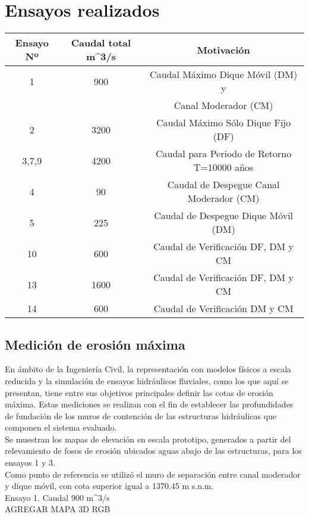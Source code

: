 \section{Ensayos realizados}

\begin{tabular}{|c|c|c|}
\hline
Ensayo Nº & Caudal total m^{3}/s & Motivación \\
\hline
1 & 900 & Caudal Máximo Dique Móvil (DM) y \\
  &     & Canal Moderador (CM) \\
\hline
2 & 3200 & Caudal Máximo Sólo Dique Fijo (DF) \\
\hline
3,7,9 & 4200 & Caudal para Periodo de Retorno T=10000 años \\
\hline
4 & 90 & Caudal de Despegue Canal Moderador (CM) \\
\hline
5 & 225 & Caudal de Despegue Dique Móvil (DM) \\
\hline
10 & 600 & Caudal de Verificación DF, DM y CM
 \\
\hline
13 & 1600 & Caudal de Verificación DF, DM y CM
 \\
\hline
14 & 600 & Caudal de Verificación DM y CM
 \\
\hline
\end{tabular}

\subsection{Medición de erosión máxima}
\label{ensayo-erosion-maxima}

En ámbito de la Ingeniería Civil, la representación con modelos físicos a escala reducida y la simulación de ensayos hidráulicos fluviales, como los que aquí se presentan, tiene entre sus objetivos principales definir las cotas de erosión máxima. Estas mediciones se realizan con el fin de establecer las profundidades de fundación de los muros de contención de las estructuras hidráulicas que componen el sistema evaluado. \\
Se muestran los mapas de elevación en escala prototipo, generados a partir del relevamiento de fosos de erosión ubicados aguas abajo de las estructuras, para los ensayos 1 y 3. \\
Como punto de referencia se utilizó el muro de separación entre canal moderador y dique móvil, con cota superior igual a 1370.45 m s.n.m.\\

Ensayo 1. Caudal 900 m^{3}/s \\
AGREGAR MAPA 3D RGB \\


